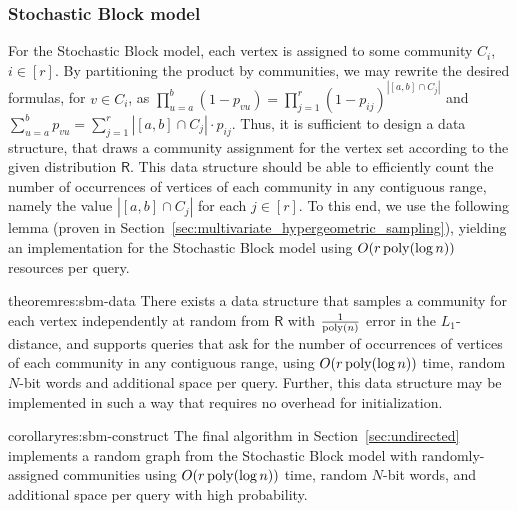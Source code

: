 \subsubsection{Stochastic Block model}
\label{sec:app_sbm}

For the Stochastic Block model, each vertex is assigned to some community $C_i$, $i \in [r]$.
By partitioning the product by communities, we may rewrite the desired formulas, for $v \in C_i$,
as $\prod_{u=a}^b (1-p_{vu}) = \prod_{j=1}^r (1-p_{ij})^{|[a,b]\cap C_j|}$ and $\sum_{u=a}^b p_{vu}=\sum_{j=1}^r |[a,b]\cap C_j|\cdot p_{ij}$.
Thus, it is sufficient to design a data structure,
that draws a community assignment for the vertex set according to the given distribution $\mathsf{R}$.
This data structure should be able to efficiently count the number of occurrences of vertices of each community in any contiguous range,
namely the value $|[a,b]\cap C_j|$ for each $j \in [r]$.
To this end, we use the following lemma (proven in Section~\ref{sec:multivariate_hypergeometric_sampling}),
yielding an implementation for the Stochastic Block model using $O(r\, \mathrm{poly}(\log n))$ resources per query.

\begin{restatable}{theorem}{res:sbm-data}\label{thm:sbm-data}
There exists a data structure that samples a community for each vertex independently at random from $\mathsf{R}$
with $\frac{1}{\mathrm{poly}(n)}$ error in the $L_1$-distance, and supports queries that ask for the number of occurrences of vertices of each community
in any contiguous range, using $O(r\,\mathrm{poly}(\log n))$ time, random $N$-bit words and additional space per query.
Further, this data structure may be implemented in such a way that requires no overhead for initialization.
\end{restatable}
\begin{restatable}{corollary}{res:sbm-construct}\label{cor:sbm-construct}
The final algorithm in Section~\ref{sec:undirected} implements a random graph from the Stochastic Block model with randomly-assigned communities
using $O(r\,\mathrm{poly}(\log n))$ time, random $N$-bit words, and additional space per query with high probability.
\end{restatable}

